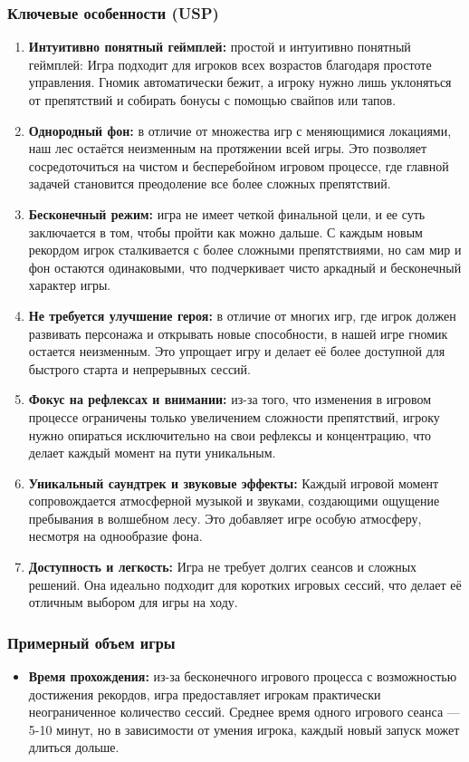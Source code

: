\documentclass{article}
\begin{document}
\subsubsection{Ключевые особенности (USP)}
\begin{enumerate}
    \item \textbf{Интуитивно понятный геймплей:} простой и интуитивно понятный геймплей: Игра подходит для игроков всех возрастов благодаря простоте управления. Гномик автоматически бежит, а игроку нужно лишь уклоняться от препятствий и собирать бонусы с помощью свайпов или тапов.
    \item \textbf{Однородный фон:} в отличие от множества игр с меняющимися локациями, наш лес остаётся неизменным на протяжении всей игры. Это позволяет сосредоточиться на чистом и бесперебойном игровом процессе, где главной задачей становится преодоление все более сложных препятствий.
    \item \textbf{Бесконечный режим:} игра не имеет четкой финальной цели, и ее суть заключается в том, чтобы пройти как можно дальше. С каждым новым рекордом игрок сталкивается с более сложными препятствиями, но сам мир и фон остаются одинаковыми, что подчеркивает чисто аркадный и бесконечный характер игры.
    \item \textbf{Не требуется улучшение героя:} в отличие от многих игр, где игрок должен развивать персонажа и открывать новые способности, в нашей игре гномик остается неизменным. Это упрощает игру и делает её более доступной для быстрого старта и непрерывных сессий.
    \item \textbf{Фокус на рефлексах и внимании:} из-за того, что изменения в игровом процессе ограничены только увеличением сложности препятствий, игроку нужно опираться исключительно на свои рефлексы и концентрацию, что делает каждый момент на пути уникальным.
    \item \textbf{Уникальный саундтрек и звуковые эффекты:} Каждый игровой момент сопровождается атмосферной музыкой и звуками, создающими ощущение пребывания в волшебном лесу. Это добавляет игре особую атмосферу, несмотря на однообразие фона.
    \item \textbf{Доступность и легкость:} Игра не требует долгих сеансов и сложных решений. Она идеально подходит для коротких игровых сессий, что делает её отличным выбором для игры на ходу.
\end{enumerate}

\subsubsection{Примерный объем игры}
\begin{itemize}
    \item \textbf{Время прохождения:} из-за бесконечного игрового процесса с возможностью достижения рекордов, игра предоставляет игрокам практически неограниченное количество сессий. Среднее время одного игрового сеанса — 5-10 минут, но в зависимости от умения игрока, каждый новый запуск может длиться дольше.
\end{itemize}
\end{document}
